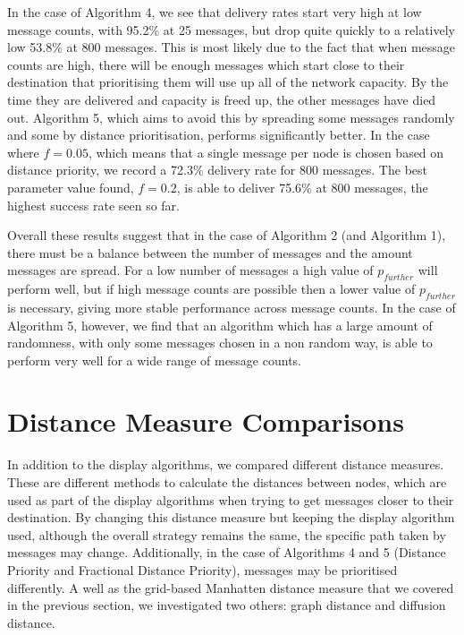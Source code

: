 \documentclass[bsc,frontabs,twoside,singlespacing,parskip,deptreport]{infthesis}     %
\begin{document}
In the case of Algorithm 4, we see that delivery rates start very high at low message counts, with 95.2\% at 25 messages, but drop quite quickly to a relatively low 53.8\% at 800 messages. This is most likely due to the fact that when message counts are high, there will be enough messages which start close to their destination that prioritising them will use up all of the network capacity. By the time they are delivered and capacity is freed up, the other messages have died out. Algorithm 5, which aims to avoid this by spreading some messages randomly and some by distance prioritisation, performs significantly better. In the case where $f=0.05$, which means that a single message per node is chosen based on distance priority, we record a 72.3\% delivery rate for 800 messages. The best parameter value found, $f=0.2$, is able to deliver 75.6\% at 800 messages, the highest success rate seen so far.

Overall these results suggest that in the case of Algorithm 2 (and Algorithm 1), there must be a balance between the number of messages and the amount messages are spread. For a low number of messages a high value of $p_{further}$ will perform well, but if high message counts are possible then a lower value of $p_{further}$ is necessary, giving more stable performance across message counts. In the case of Algorithm 5, however, we find that an algorithm which has a large amount of randomness, with only some messages chosen in a non random way, is able to perform very well for a wide range of message counts.

\section{Distance Measure Comparisons} \label{sec:distance_measure_comparisons}
In addition to the display algorithms, we compared different distance measures. These are different methods to calculate the distances between nodes, which are used as part of the display algorithms when trying to get messages closer to their destination. By changing this distance measure but keeping the display algorithm used, although the overall strategy remains the same, the specific path taken by messages may change. Additionally, in the case of Algorithms 4 and 5 (Distance Priority and Fractional Distance Priority), messages may be prioritised differently. A well as the grid-based Manhatten distance measure that we covered in the previous section, we investigated two others: graph distance and diffusion distance.
\end{document}
